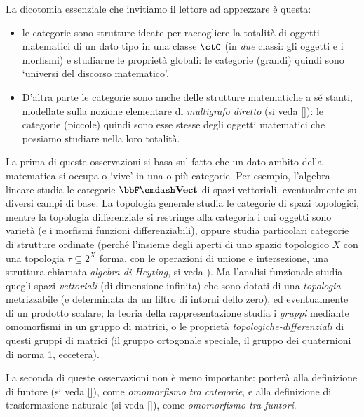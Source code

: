 La dicotomia essenziale che invitiamo il lettore ad apprezzare è questa:
\begin{itemize}
    \item le categorie sono strutture ideate per raccogliere la totalità di oggetti matematici di un dato tipo in una classe $\ctC$ (in \emph{due} classi: gli oggetti e i morfismi) e studiarne le proprietà globali: le categorie (grandi) quindi sono `universi del discorso matematico'.
    \item D'altra parte le categorie sono anche delle strutture matematiche a sé stanti, modellate sulla nozione elementare di \emph{multigrafo diretto} (si veda \autoref{}): le categorie (piccole) quindi sono esse stesse degli oggetti matematici che possiamo studiare nella loro totalità.
\end{itemize}
La prima di queste osservazioni si basa sul fatto che un dato ambito della matematica si occupa o `vive' in una o più categorie. Per esempio, l'algebra lineare studia le categorie $\bbF\emdash\ctVect$ di spazi vettoriali, eventualmente su diversi campi di base. La topologia generale studia le categorie di spazi topologici, mentre la topologia differenziale si restringe alla categoria i cui oggetti sono varietà (e i morfismi funzioni differenziabili), oppure studia particolari categorie di strutture ordinate (perché l'insieme degli aperti di uno spazio topologico $X$ con una topologia $\tau \subseteq 2^X$ forma, con le operazioni di unione e intersezione, una struttura chiamata \emph{algebra di Heyting}, si veda \cite{}). Ma l'analisi funzionale studia quegli spazi \emph{vettoriali} (di dimensione infinita) che sono dotati di una \emph{topologia} metrizzabile (e determinata da un filtro di intorni dello zero), ed eventualmente di un prodotto scalare; la teoria della rappresentazione studia i \emph{gruppi} mediante omomorfismi in un gruppo di matrici, o le proprietà \emph{topologiche-differenziali} di questi gruppi di matrici (il gruppo ortogonale speciale, il gruppo dei quaternioni di norma 1, eccetera).

La seconda di queste osservazioni non è meno importante: porterà alla definizione di funtore (si veda \autoref{}), come \emph{omomorfismo tra categorie}, e alla definizione di trasformazione naturale (si veda \autoref{}), come \emph{omomorfismo tra funtori}.

